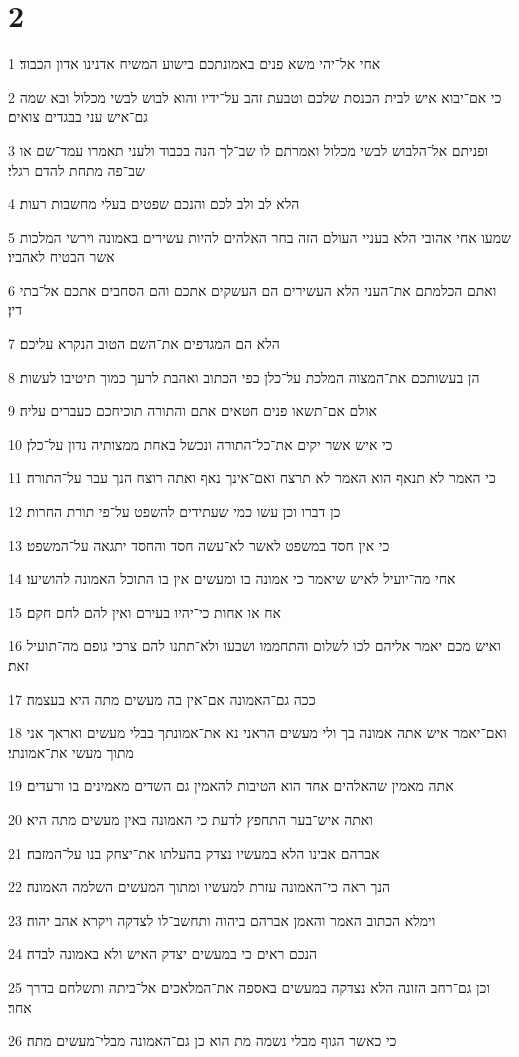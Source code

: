 \chapter{2}

\par 1 אחי אל־יהי משא פנים באמונתכם בישוע המשיח אדנינו אדון הכבוד׃
\par 2 כי אם־יבוא איש לבית הכנסת שלכם וטבעת זהב על־ידיו והוא לבוש לבשי מכלול ובא שמה גם־איש עני בבגדים צואים׃
\par 3 ופניתם אל־הלבוש לבשי מכלול ואמרתם לו שב־לך הנה בכבוד ולעני תאמרו עמד־שם או שב־פה מתחת להדם רגלי׃
\par 4 הלא לב ולב לכם והנכם שפטים בעלי מחשבות רעות׃
\par 5 שמעו אחי אהובי הלא בעניי העולם הזה בחר האלהים להיות עשירים באמונה וירשי המלכות אשר הבטיח לאהביו׃
\par 6 ואתם הכלמתם את־העני הלא העשירים הם העשקים אתכם והם הסחבים אתכם אל־בתי דין׃
\par 7 הלא הם המגדפים את־השם הטוב הנקרא עליכם׃
\par 8 הן בעשותכם את־המצוה המלכת על־כלן כפי הכתוב ואהבת לרעך כמוך תיטיבו לעשות׃
\par 9 אולם אם־תשאו פנים חטאים אתם והתורה תוכיחכם כעברים עליה׃
\par 10 כי איש אשר יקים את־כל־התורה ונכשל באחת ממצותיה נדון על־כלן׃
\par 11 כי האמר לא תנאף הוא האמר לא תרצח ואם־אינך נאף ואתה רוצח הנך עבר על־התורה׃
\par 12 כן דברו וכן עשו כמי שעתידים להשפט על־פי תורת החרות׃
\par 13 כי אין חסד במשפט לאשר לא־עשה חסד והחסד יתגאה על־המשפט׃
\par 14 אחי מה־יועיל לאיש שיאמר כי אמונה בו ומעשים אין בו התוכל האמונה להושיעו׃
\par 15 אח או אחות כי־יהיו בעירם ואין להם לחם חקם׃
\par 16 ואיש מכם יאמר אליהם לכו לשלום והתחממו ושבעו ולא־תתנו להם צרכי גופם מה־תועיל זאת׃
\par 17 ככה גם־האמונה אם־אין בה מעשים מתה היא בעצמה׃
\par 18 ואם־יאמר איש אתה אמונה בך ולי מעשים הראני נא את־אמונתך בבלי מעשים ואראך אני מתוך מעשי את־אמונתי׃
\par 19 אתה מאמין שהאלהים אחד הוא הטיבות להאמין גם השדים מאמינים בו ורעדים׃
\par 20 ואתה איש־בער התחפץ לדעת כי האמונה באין מעשים מתה היא׃
\par 21 אברהם אבינו הלא במעשיו נצדק בהעלתו את־יצחק בנו על־המזבח׃
\par 22 הנך ראה כי־האמונה עזרת למעשיו ומתוך המעשים השלמה האמונה׃
\par 23 וימלא הכתוב האמר והאמן אברהם ביהוה ותחשב־לו לצדקה ויקרא אהב יהוה׃
\par 24 הנכם ראים כי במעשים יצדק האיש ולא באמונה לבדה׃
\par 25 וכן גם־רחב הזונה הלא נצדקה במעשים באספה את־המלאכים אל־ביתה ותשלחם בדרך אחר׃
\par 26 כי כאשר הגוף מבלי נשמה מת הוא כן גם־האמונה מבלי־מעשים מתה׃

